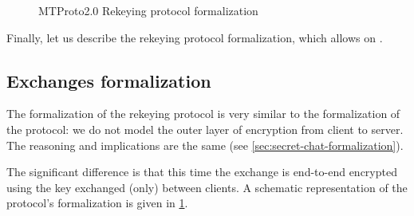 \begin{figure}[t]
  \setmscoptions
  \setlength{\instdist}{2.5cm}
  \begin{msc}{}



    \nextlevel[2]

    \nextlevel[4]
    \nextlevel


    \nextlevel[5]
    \nextlevel


    \nextlevel[4]
    \nextlevel[2]

  \end{msc}

  \centering
  \caption{MTProto2.0 Rekeying protocol formalization}
  \label{fig:rekeying-protocol-formalization}
\end{figure}

Finally, let us describe the rekeying protocol formalization, which allows \pfs{} on \schats{}.

\subsection{Exchanges formalization}
The formalization of the rekeying protocol is very similar to the formalization of the \schat{} protocol: we do not model the outer layer of encryption from client to server. The reasoning and implications are the same (see \cref{sec:secret-chat-formalization}).

The significant difference is that this time the \DiHe{} exchange is end-to-end encrypted using the \schat{} key exchanged (only) between clients. A schematic representation of the protocol's formalization is given in \cref{fig:rekeying-protocol-formalization}.

